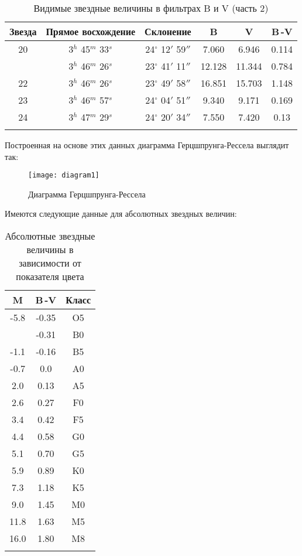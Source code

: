\newpage

\begin{table}[h]
  \centering
  \caption{Видимые звездные величины в фильтрах B и V (часть 2)}
  \begin{tabular}{cccccc}
    \toprule
    Звезда &
    Прямое восхождение &
    Склонение &
    B &
    V &
    B\,-V \\
    \midrule
    20 & 3$^h$ 45$^m$ 33$^s$ & 24$^\circ$ 12$'$ 59$''$ & 7.060 & 6.946 & 0.114 \\
    \arrayrulecolor{black!40}
    \midrule
    21 & 3$^h$ 46$^m$ 26$^s$ & 23$^\circ$ 41$'$ 11$''$ & 12.128 & 11.344 & 0.784 \\
    \midrule
    22 & 3$^h$ 46$^m$ 26$^s$ & 23$^\circ$ 49$'$ 58$''$ & 16.851 & 15.703 & 1.148 \\
    \midrule
    23 & 3$^h$ 46$^m$ 57$^s$ & 24$^\circ$ 04$'$ 51$''$ & 9.340 & 9.171 & 0.169 \\
    \midrule
    24 & 3$^h$ 47$^m$ 29$^s$ & 24$^\circ$ 20$'$ 34$''$ & 7.550 & 7.420 & 0.13 \\
    \arrayrulecolor{black}
    \bottomrule
  \end{tabular}
\end{table}

Построенная на основе этих данных диаграмма Герцшпрунга-Рессела выглядит так:

\begin{figure}[h]
  \centering
  \texttt{[image: diagram1]}
  \caption{Диаграмма Герцшпрунга-Рессела}
\end{figure}

\newpage

Имеются следующие данные для абсолютных звездных величин:

\begin{table}[h]
  \centering
  \caption{Абсолютные звездные величины в зависимости от показателя цвета}
  \begin{tabular}{ccc}
    \toprule
    M &
    B\,-V &
    Класс \\
    \midrule
    -5.8 & -0.35 & O5 \\
    \arrayrulecolor{black!40}
    \midrule
    -4.1 & -0.31 & B0 \\
    \midrule
    -1.1 & -0.16 & B5 \\
    \midrule
    -0.7 & 0.0 & A0 \\
    \midrule
    2.0 & 0.13 & A5 \\
    \midrule
    2.6 & 0.27 & F0 \\
    \midrule
    3.4 & 0.42 & F5 \\
    \midrule
    4.4 & 0.58 & G0 \\
    \midrule
    5.1 & 0.70 & G5 \\
    \midrule
    5.9 & 0.89 & K0 \\
    \midrule
    7.3 & 1.18 & K5 \\
    \midrule
    9.0 & 1.45 & M0 \\
    \midrule
    11.8 & 1.63 & M5 \\
    \midrule
    16.0 & 1.80 & M8 \\
    \arrayrulecolor{black}
    \bottomrule
  \end{tabular}
\end{table}

